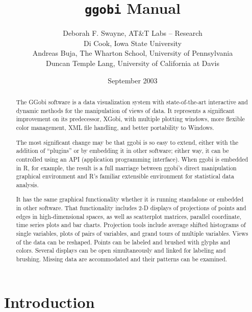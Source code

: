 \documentclass[11pt]{article}
\begin{document}
\title {{\tt ggobi} Manual}
\author{
Deborah F. Swayne, AT\&T Labs -- Research \\
Di Cook, Iowa State University \\
Andreas Buja, The Wharton School, University of Pennsylvania \\
Duncan Temple Lang, University of California at Davis
}

\date{September 2003}

\maketitle

\begin{abstract}

The GGobi software is a data visualization system with state-of-the-art
interactive and dynamic methods for the manipulation of views of
data.  It represents a significant improvement on its predecessor, XGobi,
with multiple plotting windows, more flexible color management, XML file
handling, and better portability to Windows.

The most significant change may be that ggobi is so easy to extend, either
with the addition of ``plugins'' or by embedding it in other software;
either way, it can be controlled using an API (application programming
interface).  When ggobi is embedded in R, for example, the result is a
full marriage between ggobi's direct manipulation graphical environment
and R's familiar extensible environment for statistical data analysis.

It has the same graphical functionality whether it is running
standalone or embedded in other software.  That functionality includes
2-D displays of projections of points and edges in high-dimensional
spaces, as well as scatterplot matrices, parallel coordinate, time
series plots and bar charts.  Projection tools include average shifted
histograms of single variables, plots of pairs of variables, and grand
tours of multiple variables.  Views of the data can be reshaped.
Points can be labeled and brushed with glyphs and colors.  Several
displays can be open simultaneously and linked for labeling and
brushing.  Missing data are accommodated and their patterns can be
examined.
\end{abstract}

\newpage

\tableofcontents
\newpage

\section{Introduction}
\end{document}
